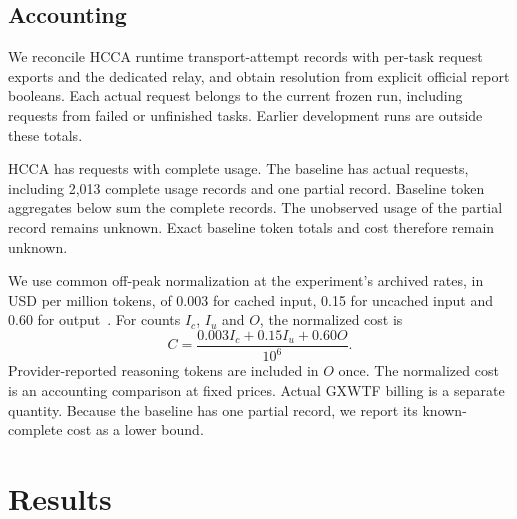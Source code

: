 \documentclass[10pt,a4paper]{article}
\begin{document}
\subsection{Accounting}

We reconcile HCCA runtime transport-attempt records with per-task request
exports and the dedicated relay, and obtain resolution from explicit official
report booleans. Each actual request belongs to the current frozen run,
including requests from failed or unfinished tasks. Earlier development runs
are outside these totals.

HCCA has \HRequests{} requests with complete usage. The baseline has
\BRequests{} actual requests, including 2,013 complete usage records and one
partial record. Baseline token aggregates below sum the complete records. The
unobserved usage of the partial record remains unknown. Exact baseline token
totals and cost therefore remain unknown.

We use common off-peak normalization at the experiment's archived rates, in
USD per million tokens, of 0.003 for cached input, 0.15 for uncached input and
0.60 for output~\cite{prices}. For counts $I_c$, $I_u$ and $O$, the normalized
cost is
\begin{equation}
  C = \frac{0.003 I_c + 0.15 I_u + 0.60 O}{10^6}.
\label{eq:cost}
\end{equation}
Provider-reported reasoning tokens are included in $O$ once. The normalized
cost is an accounting comparison at fixed prices. Actual GXWTF billing is a
separate quantity. Because the baseline has one partial record, we report its
known-complete cost as a lower bound.

\section{Results}
\end{document}

